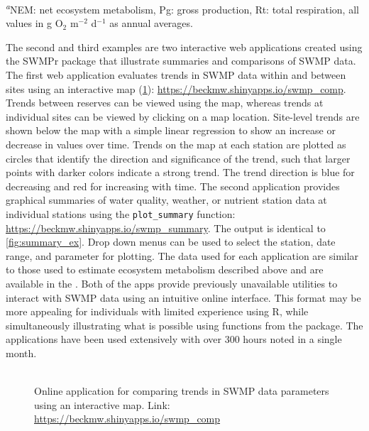 \documentclass[10pt,letterpaper]{article}\usepackage[]{graphicx}\usepackage[]{color}
\begin{document}
\begin{table}[!tbp]
\footnotesize{\textsuperscript{{\it a}}NEM: net ecosystem metabolism, Pg: gross production, Rt: total respiration, all values in g O$_2$ m$^{-2}$ d$^{-1}$ as annual averages.}\end{table}


The second and third examples are two interactive web applications \cite{Chang15} created using the SWMPr package that illustrate summaries and comparisons of \gls{SWMP} data.  The first web application evaluates trends in \gls{SWMP} data within and between sites using an interactive map (\cref{fig:swmp_comp}): \href{https://beckmw.shinyapps.io/swmp_comp}{https://beckmw.shinyapps.io/swmp\_comp}.  Trends between reserves can be viewed using the map, whereas trends at individual sites can be viewed by clicking on a map location.  Site-level trends are shown below the map with a simple linear regression to show an increase or decrease in values over time.  Trends on the map at each station are plotted as circles that identify the direction and significance of the trend, such that larger points with darker colors indicate a strong trend.  The trend direction is blue for decreasing and red for increasing with time.  The second application provides graphical summaries of water quality, weather, or nutrient station data at individual stations using the \texttt{plot\_summary} function: \href{https://beckmw.shinyapps.io/swmp_summary/}{https://beckmw.shinyapps.io/swmp\_summary}.  The output is identical to \cref{fig:summary_ex}. Drop down menus can be used to select the station, date range, and parameter for plotting. The data used for each application are similar to those used to estimate ecosystem metabolism described above and are available in the .  Both of the apps provide previously unavailable utilities to interact with \gls{SWMP} data using an intuitive online interface.  This format may be more appealing for individuals with limited experience using R, while simultaneously illustrating what is possible using functions from the package. The applications have been used extensively with over 300 hours noted in a single month.   

\begin{figure}
\begin{center}
\includegraphics[width = 0\textwidth]{figure/swmp_comp.pdf}
\caption{Online application for comparing trends in \gls{SWMP} data parameters using an interactive map.  Link: \href{https://beckmw.shinyapps.io/swmp_comp}{https://beckmw.shinyapps.io/swmp\_comp}}
\label{fig:swmp_comp}
\end{center}
\end{figure}
\end{document}
